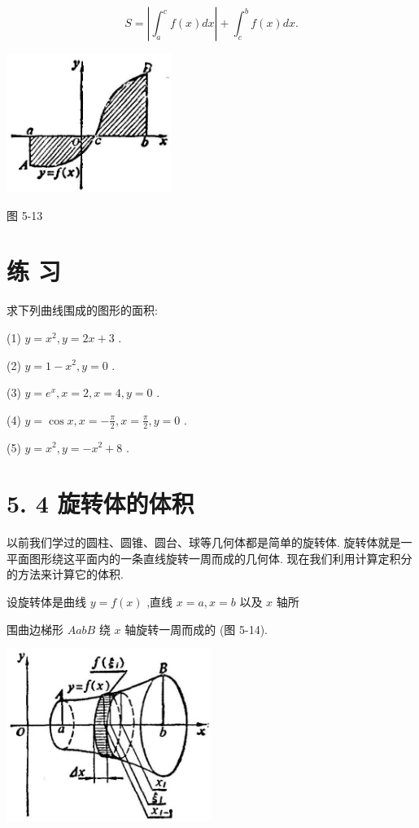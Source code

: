 \documentclass[10pt]{article}
\begin{document}
\[
S = \left| {{\int }_{a}^{c}f\left( x\right) {dx}}\right| + {\int }_{c}^{b}f\left( x\right) {dx}.
\]

\begin{center}
\includegraphics[max width=0.4\textwidth]{images/01912c18-5c3f-733d-b775-749ba9897a9d_235_691141.jpg}
\end{center}

图 5-13

\section*{练 习}

求下列曲线围成的图形的面积:

(1) \(y = {x}^{2},y = {2x} + 3\) .

(2) \(y = 1 - {x}^{2},y = 0\) .

(3) \(y = {e}^{x},x = 2,x = 4,y = 0\) .

(4) \(y = \cos x,x = - \frac{\pi }{2},x = \frac{\pi }{2},y = 0\) .

(5) \(y = {x}^{2},y = - {x}^{2} + 8\) .

\section*{5. 4 旋转体的体积}

以前我们学过的圆柱、圆锥、圆台、球等几何体都是简单的旋转体. 旋转体就是一平面图形绕这平面内的一条直线旋转一周而成的几何体. 现在我们利用计算定积分的方法来计算它的体积.

设旋转体是曲线 \(y = f\left( x\right)\) ,直线 \(x = a,x = b\) 以及 \(x\) 轴所

围曲边梯形 \({AabB}\) 绕 \(x\) 轴旋转一周而成的 (图 5-14).

\begin{center}
\includegraphics[max width=0.5\textwidth]{images/01912c18-5c3f-733d-b775-749ba9897a9d_236_380755.jpg}
\end{center}
\end{document}
